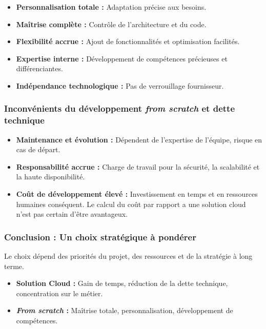 \begin{itemize}
\item {\bf Personnalisation totale : } Adaptation précise aux besoins.
\item {\bf Maîtrise complète : } Contrôle de l'architecture et du code.
\item {\bf Flexibilité accrue : } Ajout de fonctionnalités et optimisation facilités.
\item {\bf Expertise interne : } Développement de compétences précieuses et différenciantes.
\item {\bf Indépendance technologique : } Pas de verrouillage fournisseur.
\end{itemize}

\subsubsection{Inconvénients du développement {\it from scratch} et dette technique}

\begin{itemize}
\item {\bf Maintenance et évolution : } Dépendent de l'expertise de l'équipe,
risque en cas de départ.
\item {\bf Responsabilité accrue : } Charge de travail pour la sécurité, la
scalabilité et la haute disponibilité.
\item {\bf Coût de développement élevé : } Investissement en temps et en
ressources humaines conséquent. Le calcul du coût par rapport a une solution
cloud n'est pas certain d'être avantageux.
\end{itemize}

\subsubsection{Conclusion : Un choix stratégique à pondérer}

Le choix dépend des priorités du projet, des ressources et de la stratégie à
long terme.

\begin{itemize}
\item {\bf Solution Cloud : } Gain de temps, réduction de la dette technique,
concentration sur le métier.
\item {\bf  {\it From scratch} : } Maîtrise totale, personnalisation,
développement de compétences.
\end{itemize}
